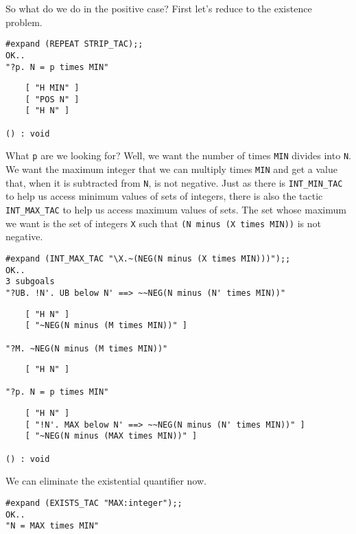 So what do we do in the positive case?  First let's reduce to the
existence problem.
\begin{session}
\begin{verbatim}
#expand (REPEAT STRIP_TAC);;
OK..
"?p. N = p times MIN"
\end{verbatim}
\mvdots
\begin{verbatim}
    [ "H MIN" ]
    [ "POS N" ]
    [ "H N" ]

() : void
\end{verbatim}
\end{session}

What {\small\tt p} are we looking for?  Well, we want the number of
times {\small\verb+MIN+} divides into {\small\tt N}.  We want the
maximum integer that we can multiply times {\small\verb+MIN+} and get
a value that, when it is subtracted from {\small\tt N}, is not negative.
Just as there is {\small\verb+INT_MIN_TAC+} to help us access minimum
values of sets of integers, there is also the tactic
{\small\verb+INT_MAX_TAC+} to help us access maximum values of sets.
The set whose maximum we want is the set of integers {\small\tt X}
such that {\small\verb+(N minus (X times MIN))+} is not negative. 
\begin{session}
\begin{verbatim}
#expand (INT_MAX_TAC "\X.~(NEG(N minus (X times MIN)))");;
OK..
3 subgoals
"?UB. !N'. UB below N' ==> ~~NEG(N minus (N' times MIN))"
\end{verbatim}
\mvdots
\begin{verbatim}
    [ "H N" ]
    [ "~NEG(N minus (M times MIN))" ]

"?M. ~NEG(N minus (M times MIN))"
\end{verbatim}
\mvdots
\begin{verbatim}
    [ "H N" ]

"?p. N = p times MIN"
\end{verbatim}
\mvdots
\begin{verbatim}
    [ "H N" ]
    [ "!N'. MAX below N' ==> ~~NEG(N minus (N' times MIN))" ]
    [ "~NEG(N minus (MAX times MIN))" ]

() : void
\end{verbatim}
\end{session}

We can eliminate the existential quantifier now.
\begin{session}
\begin{verbatim}
#expand (EXISTS_TAC "MAX:integer");;
OK..
"N = MAX times MIN"
\end{verbatim}
\evdots
\end{session}

